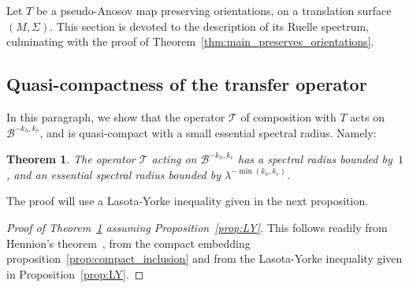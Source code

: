 \documentclass[10pt]{amsart}
\newcommand{\boB}{\mathcal{B}}
\newcommand{\boT}{\mathcal{T}}
\newtheorem{thm}{Theorem}[section]
\theoremstyle{definition}
\numberwithin{equation}{section}
\begin{document}
\label{sec:Ruelle_spectrum}

Let $T$ be a pseudo-Anosov map preserving orientations, on a translation
surface $(M,\Sigma)$. This section is devoted to the description of its
Ruelle spectrum, culminating with the proof of
Theorem~\ref{thm:main_preserves_orientations}.

\subsection{Quasi-compactness of the transfer operator}

In this paragraph, we show that the operator $\boT$ of composition with $T$
acts on $\boB^{-k_h, k_v}$, and is quasi-compact with a small essential
spectral radius. Namely:

\begin{thm}
\label{thm:rho_ess} The operator $\boT$ acting on $\boB^{-k_h, k_v}$ has a
spectral radius bounded by~$1$, and an essential spectral radius bounded by
$\lambda^{- \min(k_h, k_v)}$.
\end{thm}

The proof will use a Lasota-Yorke inequality given in the next proposition.

\begin{proof}[Proof of Theorem~\ref{thm:rho_ess} assuming Proposition~\ref{prop:LY}]
This follows readily from Hennion's theorem~\cite{hennion}, from the compact
embedding proposition~\ref{prop:compact_inclusion} and from the Lasota-Yorke
inequality given in Proposition~\ref{prop:LY}.
\end{proof}
\end{document}
